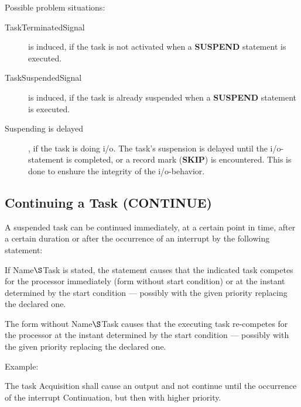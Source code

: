 Possible problem situations:
\begin{description}
\item[TaskTerminatedSignal] is induced, if the task is not activated when 
a {\bf SUSPEND} statement is executed.
\item[TaskSuspendedSignal] is induced, if the task is already suspended when
a {\bf SUSPEND} statement is executed.
\item[Suspending is delayed], if the task is doing i/o. The task's suspension
is delayed until the i/o-statement is completed, or a record mark ({\bf SKIP}) 
is encountered. This is done to enshure the integrity of the i/o-behavior.
\end{description}


\subsection{Continuing a Task (CONTINUE)}    %
\label{sec_continue}

A suspended task can be continued immediately, at a certain point in
time, after a certain duration or after the occurrence of an interrupt by
the following statement:







If Name$\S $Task is stated, the statement causes that the indicated task
competes for the processor immediately (form without start condition) or
at the instant determined by the start condition --- possibly with the
given priority replacing the declared one.

The form without Name$\S $Task causes that the executing task re-competes
for the processor at the instant determined by the start condition ---
possibly with the given priority replacing the declared one.

Example:

The task Acquisition shall cause an output and not continue until
the occurrence of the interrupt Continuation, but then with higher
priority.

